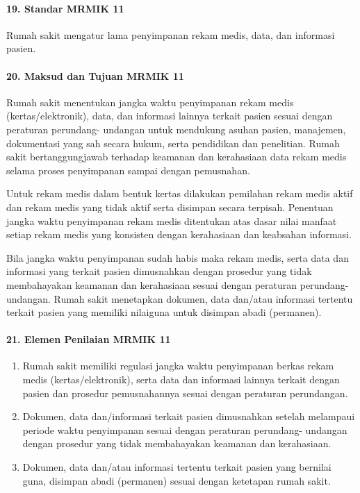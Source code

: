 \documentclass[
]{book}
\providecommand{\tightlist}{%
  \setlength{\itemsep}{0pt}\setlength{\parskip}{0pt}}
\begin{document}
\hypertarget{standar-mrmik-11}{%
\paragraph*{19. Standar MRMIK 11}\label{standar-mrmik-11}}

Rumah sakit mengatur lama penyimpanan rekam medis, data, dan informasi pasien.

\hypertarget{maksud-dan-tujuan-mrmik-11}{%
\paragraph*{20. Maksud dan Tujuan MRMIK 11}\label{maksud-dan-tujuan-mrmik-11}}

Rumah sakit menentukan jangka waktu penyimpanan rekam medis (kertas/elektronik), data, dan informasi lainnya terkait pasien sesuai dengan peraturan perundang- undangan untuk mendukung asuhan pasien, manajemen, dokumentasi yang sah secara hukum, serta pendidikan dan penelitian. Rumah sakit bertanggungjawab terhadap keamanan dan kerahasiaan data rekam medis selama proses penyimpanan sampai dengan pemusnahan.

Untuk rekam medis dalam bentuk kertas dilakukan pemilahan rekam medis aktif dan rekam medis yang tidak aktif serta disimpan secara terpisah. Penentuan jangka waktu penyimpanan rekam medis ditentukan atas dasar nilai manfaat setiap rekam medis yang konsisten dengan kerahasiaan dan keabsahan informasi.

Bila jangka waktu penyimpanan sudah habis maka rekam medis, serta data dan informasi yang terkait pasien dimusnahkan dengan prosedur yang tidak membahayakan keamanan dan kerahasiaan sesuai dengan peraturan perundang-undangan. Rumah sakit menetapkan dokumen, data dan/atau informasi tertentu terkait pasien yang memiliki nilaiguna untuk disimpan abadi (permanen).

\hypertarget{elemen-penilaian-mrmik-11}{%
\paragraph*{21. Elemen Penilaian MRMIK 11}\label{elemen-penilaian-mrmik-11}}

\begin{enumerate}
\def\labelenumi{\alph{enumi}.}
\tightlist
\item
  Rumah sakit memiliki regulasi jangka waktu penyimpanan berkas rekam medis (kertas/elektronik), serta data dan informasi lainnya terkait dengan pasien dan prosedur pemusnahannya sesuai dengan peraturan perundangan.
\item
  Dokumen, data dan/informasi terkait pasien dimusnahkan setelah melampaui periode waktu penyimpanan sesuai dengan peraturan perundang- undangan dengan prosedur yang tidak membahayakan keamanan dan kerahasiaan.
\item
  Dokumen, data dan/atau informasi tertentu terkait pasien yang bernilai guna, disimpan abadi (permanen) sesuai dengan ketetapan rumah sakit.
\end{enumerate}
\end{document}
